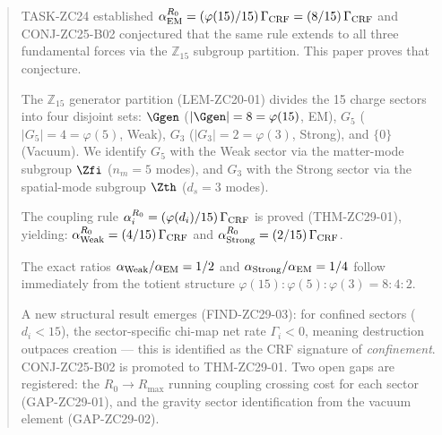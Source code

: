 \documentclass[12pt, a4paper]{article}
\begin{document}


\begin{abstract}
\sloppy
TASK-ZC24 established $\alpha_{\rm EM}^{R_0}
= (\varphi(15)/15)\,\Gamma_{\rm CRF} = (8/15)\,\Gamma_{\rm CRF}$
and CONJ-ZC25-B02 conjectured that the same rule extends to
all three fundamental forces via the $\mathbb{Z}_{15}$ subgroup
partition.
This paper proves that conjecture.

The $\mathbb{Z}_{15}$ generator partition (LEM-ZC20-01) divides
the 15 charge sectors into four disjoint sets:
$\Ggen$ ($|\Ggen|=8=\varphi(15)$, EM),
$G_5$ ($|G_5|=4=\varphi(5)$, Weak),
$G_3$ ($|G_3|=2=\varphi(3)$, Strong), and
$\{0\}$ (Vacuum).
We identify $G_5$ with the Weak sector via the matter-mode
subgroup $\Zfi$ ($n_m=5$ modes), and $G_3$ with the Strong
sector via the spatial-mode subgroup $\Zth$ ($d_s=3$ modes).

The coupling rule $\alpha_i^{R_0} = (\varphi(d_i)/15)\,\Gamma_{\rm CRF}$
is proved (THM-ZC29-01), yielding:
$\alpha_{\rm Weak}^{R_0} = (4/15)\,\Gamma_{\rm CRF}$
and $\alpha_{\rm Strong}^{R_0} = (2/15)\,\Gamma_{\rm CRF}$.

The exact ratios $\alpha_{\rm Weak}/\alpha_{\rm EM} = 1/2$ and
$\alpha_{\rm Strong}/\alpha_{\rm EM} = 1/4$ follow immediately
from the totient structure $\varphi(15):\varphi(5):\varphi(3)
= 8:4:2$.

A new structural result emerges (FIND-ZC29-03):
for confined sectors ($d_i < 15$), the sector-specific
chi-map net rate $\Gamma_i < 0$, meaning destruction outpaces
creation — this is identified as the CRF signature of
\emph{confinement}.
CONJ-ZC25-B02 is promoted to THM-ZC29-01.
Two open gaps are registered: the $R_0 \to R_{\max}$ running
coupling crossing cost for each sector (GAP-ZC29-01), and the
gravity sector identification from the vacuum element (GAP-ZC29-02).
\end{abstract}
\end{document}

